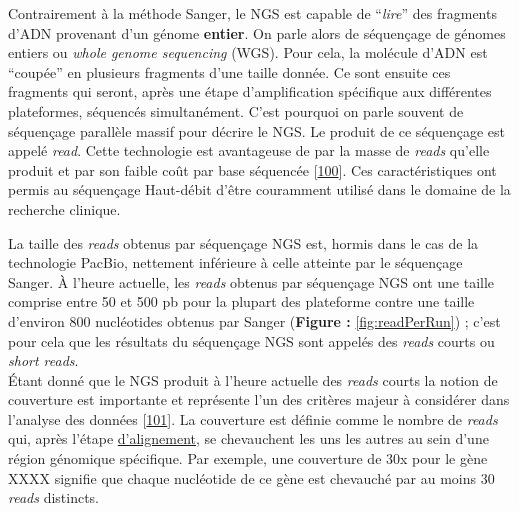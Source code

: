 \documentclass[12pt,twoside]{ugathesis}
\theoremstyle{definition}
\theoremstyle{definition}
\theoremstyle{remark}
\begin{document}
Contrairement à la méthode Sanger, le NGS est capable de ``\emph{lire}''
des fragments d'ADN provenant d'un génome \textbf{entier}. On parle
alors de séquençage de génomes entiers ou \emph{whole genome sequencing}
(WGS). Pour cela, la molécule d'ADN est ``coupée'' en plusieurs
fragments d'une taille donnée. Ce sont ensuite ces fragments qui seront,
après une étape d'amplification spécifique aux différentes plateformes,
séquencés simultanément. C'est pourquoi on parle souvent de séquençage
parallèle massif pour décrire le NGS. Le produit de ce séquençage est
appelé \emph{read}. Cette technologie est avantageuse de par la masse de
\emph{reads} qu'elle produit et par son faible coût par base séquencée
{[}\protect\hyperlink{ref-Metzker2010}{100}{]}. Ces caractéristiques ont
permis au séquençage Haut-débit d'être couramment utilisé dans le
domaine de la recherche clinique.

La taille des \emph{reads} obtenus par séquençage NGS est, hormis dans
le cas de la technologie PacBio, nettement inférieure à celle atteinte
par le séquençage Sanger. À l'heure actuelle, les \emph{reads} obtenus
par séquençage NGS ont une taille comprise entre 50 et 500 pb pour la
plupart des plateforme contre une taille d'environ 800 nucléotides
obtenus par Sanger (\textbf{Figure :} \ref{fig:readPerRun}) ; c'est pour
cela que les résultats du séquençage NGS sont appelés des \emph{reads}
courts ou \emph{short reads}.\\
Étant donné que le NGS produit à l'heure actuelle des \emph{reads}
courts la notion de couverture est importante et représente l'un des
critères majeur à considérer dans l'analyse des données
{[}\protect\hyperlink{ref-Sims2014}{101}{]}. La couverture est définie
comme le nombre de \emph{reads} qui, après l'étape
\protect\hyperlink{lalignement}{d'alignement}, se chevauchent les uns
les autres au sein d'une région génomique spécifique. Par exemple, une
couverture de 30x pour le gène XXXX signifie que chaque nucléotide de ce
gène est chevauché par au moins 30 \emph{reads} distincts.

\newpage
\end{document}
